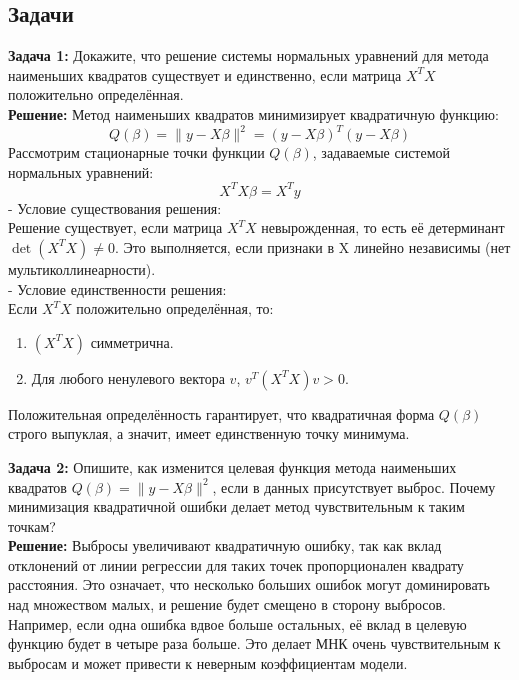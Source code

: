 \subsection{Задачи}

\textbf{Задача 1:}
Докажите, что решение системы нормальных уравнений для метода наименьших квадратов существует и единственно, если матрица \(X^T X\) положительно определённая. \\
\textbf{Решение:}
Метод наименьших квадратов минимизирует квадратичную функцию:
\[
Q(\beta) = \|y - X\beta\|^2 = (y - X\beta)^T (y - X\beta)
\]
Рассмотрим стационарные точки функции \(Q(\beta)\), задаваемые системой нормальных уравнений:
\[
X^TX\beta = X^Ty
\]
- Условие существования решения: \\
Решение существует, если матрица \(X^T X\) невырожденная, то есть её детерминант \(\det(X^T X) \neq 0\). Это выполняется, если признаки в X линейно независимы (нет мультиколлинеарности). \\
- Условие единственности решения: \\
Если \(X^T X\) положительно определённая, то:  
\begin{enumerate}
	\item \((X^T X)\) симметрична.
	\item Для любого ненулевого вектора \(v\), \(v^T(X^T X)v > 0\).
\end{enumerate}
Положительная определённость гарантирует, что квадратичная форма \(Q(\beta)\) строго выпуклая, а значит, имеет единственную точку минимума.

\textbf{Задача 2:}
Опишите, как изменится целевая функция метода наименьших квадратов \( Q(\beta) = \|y - X\beta\|^2 \), если в данных присутствует выброс. Почему минимизация квадратичной ошибки делает метод чувствительным к таким точкам? \\
\textbf{Решение:}
Выбросы увеличивают квадратичную ошибку, так как вклад отклонений от линии регрессии для таких точек пропорционален квадрату расстояния. Это означает, что несколько больших ошибок могут доминировать над множеством малых, и решение будет смещено в сторону выбросов. Например, если одна ошибка вдвое больше остальных, её вклад в целевую функцию будет в четыре раза больше. Это делает МНК очень чувствительным к выбросам и может привести к неверным коэффициентам модели.  

